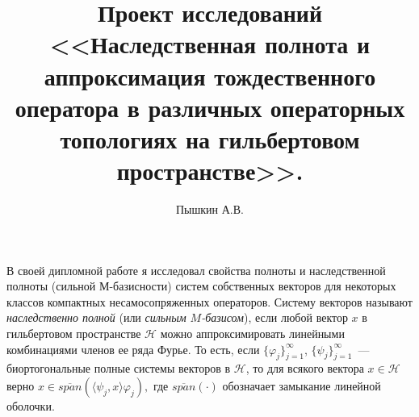 \documentclass[a4paper,12pt]{article}
\newcommand{\cspan}[1]{\overline{span}\left(#1\right)}
\renewcommand{\phi}{\varphi}
\numberwithin{prop_under_lemma}{lemma}
\begin{document}
\title{Проект исследований <<Наследственная полнота и аппроксимация тождественного оператора в 
  различных операторных топологиях на гильбертовом пространстве>>.}
\author{Пышкин А.В.}
\date{}
\maketitle

В своей дипломной работе я исследовал свойства полноты и наследственной полноты
(сильной М-базисности) систем собственных векторов для некоторых классов компактных
несамосопряженных операторов. Систему векторов называют {\it наследственно полной} (или {\it сильным $M$-базисом}), если
любой вектор $x$ в гильбертовом пространстве $\mathcal{H}$ можно аппроксимировать
линейными комбинациями членов ее ряда Фурье. То есть, если $\{\phi_j\}_{j=1}^\infty$, $\{\psi_j\}_{j=1}^\infty$~---
биортогональные полные системы векторов в $\mathcal{H}$, то для всякого вектора $x \in \mathcal{H}$ верно
$x \in \cspan{\langle\psi_j, x\rangle \phi_j},$
где $\cspan{\cdot}$ обозначает замыкание линейной оболочки.
\end{document}
